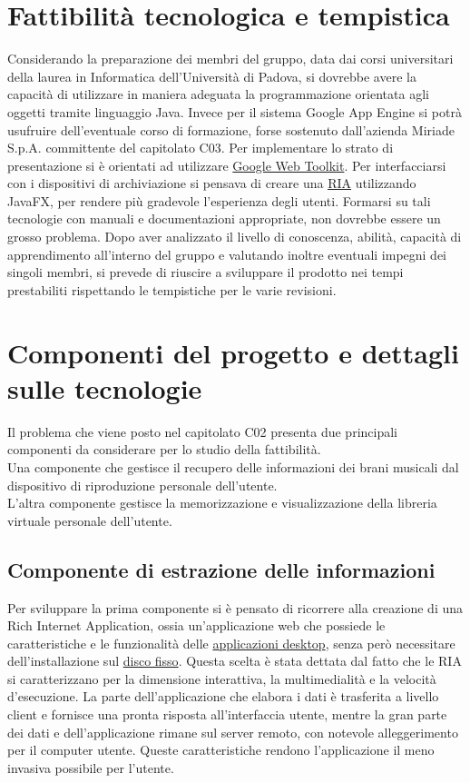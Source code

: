 \section{Fattibilit\`a tecnologica e tempistica}
Considerando la preparazione dei membri del gruppo, data dai corsi universitari
della laurea in Informatica dell'Universit\`a di Padova, si dovrebbe avere la
capacit\`a di utilizzare in maniera adeguata la programmazione orientata agli
oggetti tramite linguaggio Java. Invece per il sistema Google App Engine si
potr\`a usufruire dell'eventuale corso di formazione, forse sostenuto
dall'azienda Miriade S.p.A. committente del capitolato C03.
Per implementare lo strato di presentazione si \`e orientati ad utilizzare
\underline{Google Web Toolkit}. Per interfacciarsi con i dispositivi di
archiviazione si pensava di creare una \underline{RIA} utilizzando JavaFX, per
rendere pi\`u gradevole l'esperienza degli utenti. Formarsi su tali tecnologie con manuali e
documentazioni appropriate, non dovrebbe essere un grosso problema. Dopo aver
analizzato il livello di conoscenza, abilit\`a, capacit\`a di apprendimento
all'interno del gruppo e valutando inoltre eventuali impegni dei singoli membri,
si prevede di riuscire a sviluppare il prodotto nei tempi prestabiliti
rispettando le tempistiche per le varie revisioni.

\section{Componenti del progetto e dettagli sulle tecnologie}
Il problema che viene posto nel capitolato C02 presenta due principali componenti
da considerare per lo studio della fattibilit\`a.\\
Una componente che gestisce il recupero delle informazioni dei brani musicali
dal dispositivo di riproduzione personale dell'utente.\\
L'altra componente gestisce la memorizzazione e visualizzazione della libreria
virtuale personale dell'utente.

\subsection{Componente di estrazione delle informazioni}
Per sviluppare la prima componente si \`e pensato di ricorrere alla creazione di
una Rich Internet Application, ossia un'applicazione web che possiede le
caratteristiche e le funzionalit\`a delle \underline{applicazioni desktop}, senza
per\`o necessitare dell'installazione sul \underline{disco fisso}. Questa scelta
\`e stata dettata dal fatto che le RIA si caratterizzano per la dimensione
interattiva, la multimedialit\`a e la velocit\`a d'esecuzione. La parte
dell'applicazione che elabora i dati \`e trasferita a livello client e fornisce
una pronta risposta all'interfaccia utente, mentre la gran parte dei dati e
dell'applicazione rimane sul server remoto, con notevole alleggerimento per il
computer utente. Queste caratteristiche rendono l'applicazione il meno invasiva
possibile per l'utente.

